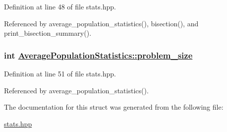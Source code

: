 Definition at line 48 of file stats.hpp.

Referenced by average\_\-population\_\-statistics(), bisection(), and print\_\-bisection\_\-summary().\hypertarget{struct_average_population_statistics_69ff50e9cdd8050d91884516958c9b28}{
\subsubsection[problem\_\-size]{\setlength{\rightskip}{0pt plus 5cm}int \hyperlink{struct_average_population_statistics_69ff50e9cdd8050d91884516958c9b28}{Average\-Population\-Statistics::problem\_\-size}}}
\label{struct_average_population_statistics_69ff50e9cdd8050d91884516958c9b28}




Definition at line 51 of file stats.hpp.

Referenced by average\_\-population\_\-statistics().

The documentation for this struct was generated from the following file:\begin{CompactItemize}
\item 
\hyperlink{stats_8hpp}{stats.hpp}\end{CompactItemize}
